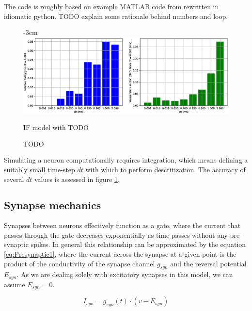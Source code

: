 The code is roughly based on example MATLAB code from \autocite[table
3.1]{trappenberg_fundamentals_2009} rewritten in idiomatic python. TODO explain
some rationale behind numbers and loop.

\begin{figure}[h!]
    \centering
    \addtolength{\leftskip} {-3cm}
    \addtolength{\rightskip}{-3cm}
    \includegraphics[width=1.4\linewidth]{figures/graphs/entropyofdt.eps}
    \caption{IF model with TODO}
    \caption{TODO}
    \label{fig:entropyofdt}
\end{figure}

Simulating a
neuron computationally requires integration, which means defining a suitably
small time-step $dt$ with which to perform descritization. The accuracy of
several $dt$ values is assessed in figure \ref{fig:entropyofdt}.



\subsection{Synapse mechanics}

Synapses between neurons effectively function as a gate, where the current that
passes through the gate decreases exponentially as time passes without any
pre-synaptic spikes. In general this relationship can be approximated by the
equation \ref{eq:Presynaptic1}, where the current across the synapse at a given
point is the product of the conductivity of the synapse channel $g_{syn}$ and
the reversal potential $E_{syn}$. As we are dealing solely with excitatory
synapses in this model, we can assume $E_{syn} = 0$.

\begin{equation}\label{eq:Presynaptic1}
    I_{syn} = g_{syn}(t)\cdot(v-E_{syn})
\end{equation}

